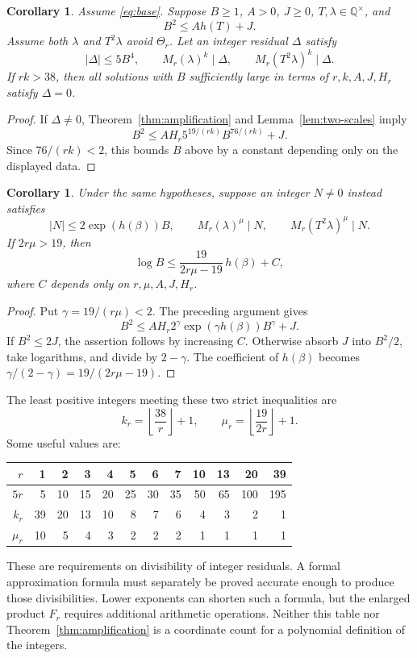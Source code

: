 \documentclass[11pt,a4paper]{article}
\newtheorem{corollary}[theorem]{Corollary}
\theoremstyle{definition}\newtheorem{definition}[theorem]{Definition}
\newcommand{\Q}{\mathbb Q}\newcommand{\Z}{\mathbb Z}
\begin{document}
\begin{corollary}\label{cor:residual}
Assume \eqref{eq:base}. Suppose $B\ge1$, $A>0$, $J\ge0$,
$T,\lambda\in\Q^\times$, and
\[
 B^2\le A h(T)+J.
\]
Assume both $\lambda$ and $T^2\lambda$ avoid $\Theta_r$.
Let an integer residual $\Delta$ satisfy
\[
 |\Delta|\le5B^4,\qquad
 M_r(\lambda)^k\mid\Delta,\qquad
 M_r(T^2\lambda)^k\mid\Delta.
\]
If $rk>38$, then all solutions with $B$ sufficiently large in terms
of $r,k,A,J,H_r$ satisfy $\Delta=0$.
\end{corollary}
\begin{proof}
If $\Delta\ne0$, Theorem~\ref{thm:amplification} and
Lemma~\ref{lem:two-scales} imply
\[
 B^2\le AH_r 5^{19/(rk)}B^{76/(rk)}+J.
\]
Since $76/(rk)<2$, this bounds $B$ above by a constant depending
only on the displayed data.
\end{proof}

\begin{corollary}\label{cor:input}
Under the same hypotheses, suppose an integer $N\ne0$ instead
satisfies
\[
 |N|\le2\exp(h(\beta))B,\qquad
 M_r(\lambda)^\mu\mid N,\qquad
 M_r(T^2\lambda)^\mu\mid N.
\]
If $2r\mu>19$, then
\[
 \log B\le \frac{19}{2r\mu-19}\,h(\beta)+C,
\]
where $C$ depends only on $r,\mu,A,J,H_r$.
\end{corollary}
\begin{proof}
Put $\gamma=19/(r\mu)<2$. The preceding argument gives
\[
 B^2\le AH_r2^\gamma\exp(\gamma h(\beta))B^\gamma+J.
\]
If $B^2\le2J$, the assertion follows by increasing $C$.
Otherwise absorb $J$ into $B^2/2$, take logarithms, and divide by
$2-\gamma$. The coefficient of $h(\beta)$ becomes
$\gamma/(2-\gamma)=19/(2r\mu-19)$.
\end{proof}

The least positive integers meeting these two strict inequalities are
\[
 k_r=\left\lfloor\frac{38}{r}\right\rfloor+1,
 \qquad \mu_r=\left\lfloor\frac{19}{2r}\right\rfloor+1.
\]
Some useful values are:
\begin{center}
\begin{tabular}{rrrrrrrrrrrr}\toprule
$r$&1&2&3&4&5&6&7&10&13&20&39\\\midrule
$5r$&5&10&15&20&25&30&35&50&65&100&195\\
$k_r$&39&20&13&10&8&7&6&4&3&2&1\\
$\mu_r$&10&5&4&3&2&2&2&1&1&1&1\\\bottomrule
\end{tabular}
\end{center}
These are requirements on divisibility of integer residuals. A formal
approximation formula must separately be proved accurate enough to
produce those divisibilities. Lower exponents can shorten such a
formula, but the enlarged product $F_r$ requires additional arithmetic
operations. Neither this table nor Theorem~\ref{thm:amplification}
is a coordinate count for a polynomial definition of the integers.
\end{document}
